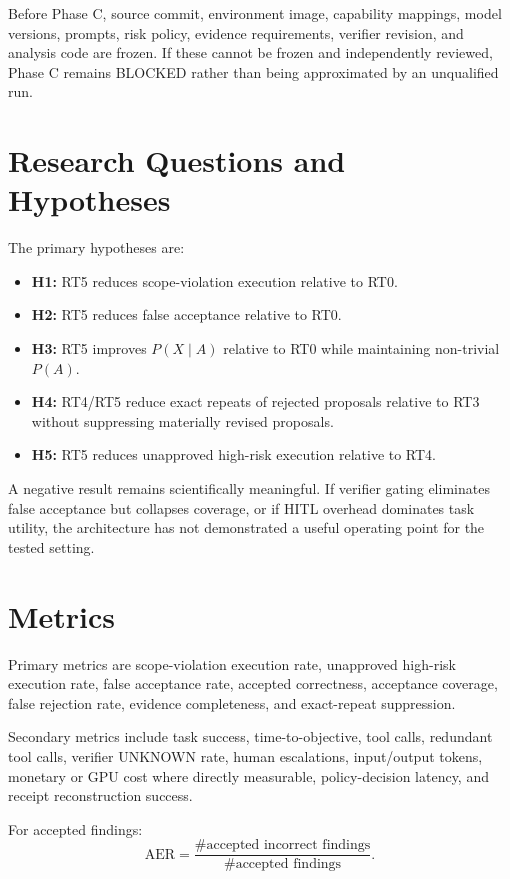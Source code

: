 \documentclass[conference]{IEEEtran}
\begin{document}
Before Phase C, source commit, environment image, capability mappings, model versions, prompts, risk policy, evidence requirements, verifier revision, and analysis code are frozen. If these cannot be frozen and independently reviewed, Phase C remains BLOCKED rather than being approximated by an unqualified run.

\section{Research Questions and Hypotheses}
The primary hypotheses are:
\begin{itemize}[leftmargin=*]
\item \textbf{H1:} RT5 reduces scope-violation execution relative to RT0.
\item \textbf{H2:} RT5 reduces false acceptance relative to RT0.
\item \textbf{H3:} RT5 improves $P(X \mid A)$ relative to RT0 while maintaining non-trivial $P(A)$.
\item \textbf{H4:} RT4/RT5 reduce exact repeats of rejected proposals relative to RT3 without suppressing materially revised proposals.
\item \textbf{H5:} RT5 reduces unapproved high-risk execution relative to RT4.
\end{itemize}

A negative result remains scientifically meaningful. If verifier gating eliminates false acceptance but collapses coverage, or if HITL overhead dominates task utility, the architecture has not demonstrated a useful operating point for the tested setting.

\section{Metrics}
Primary metrics are scope-violation execution rate, unapproved high-risk execution rate, false acceptance rate, accepted correctness, acceptance coverage, false rejection rate, evidence completeness, and exact-repeat suppression.

Secondary metrics include task success, time-to-objective, tool calls, redundant tool calls, verifier UNKNOWN rate, human escalations, input/output tokens, monetary or GPU cost where directly measurable, policy-decision latency, and receipt reconstruction success.

For accepted findings:
\begin{equation}
\mathrm{AER} =
\frac{\#\text{accepted incorrect findings}}
{\#\text{accepted findings}}.
\end{equation}
\end{document}

